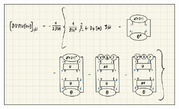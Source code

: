 \begin{figure}
	\centering
	\includegraphics[width=0.8\textwidth]{figures/appendix_C/hvp_truncation_error.jpeg}
	\caption{}
	\label{fig:hvp_truncation_error}
\end{figure}
